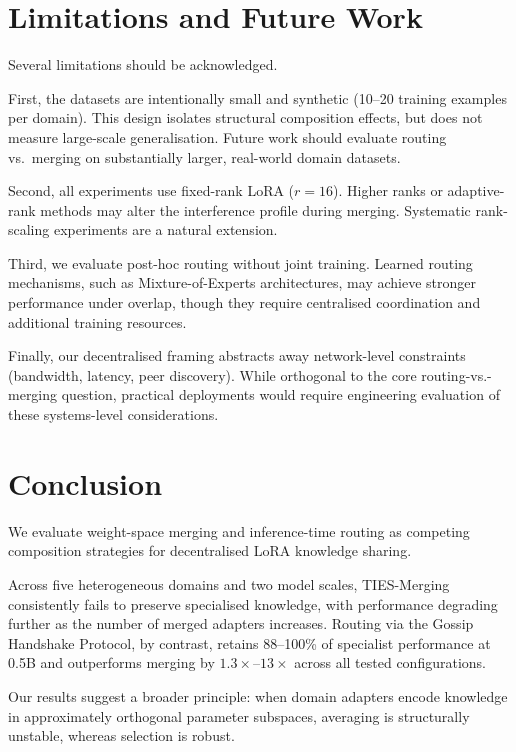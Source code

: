 \documentclass[conference, 10pt]{IEEEtran}
\begin{document}
\section{Limitations and Future Work}
\label{sec:limitations}

Several limitations should be acknowledged.

First, the datasets are intentionally small and synthetic
(10--20 training examples per domain).
This design isolates structural composition effects,
but does not measure large-scale generalisation.
Future work should evaluate routing vs.\ merging on
substantially larger, real-world domain datasets.

Second, all experiments use fixed-rank LoRA ($r = 16$).
Higher ranks or adaptive-rank methods may alter the
interference profile during merging.
Systematic rank-scaling experiments are a natural extension.

Third, we evaluate post-hoc routing without joint training.
Learned routing mechanisms, such as Mixture-of-Experts
architectures, may achieve stronger performance under overlap,
though they require centralised coordination and additional
training resources.

Finally, our decentralised framing abstracts away
network-level constraints (bandwidth, latency,
peer discovery).
While orthogonal to the core routing-vs.-merging question,
practical deployments would require engineering evaluation
of these systems-level considerations.

\section{Conclusion}
\label{sec:conclusion}

We evaluate weight-space merging and inference-time routing
as competing composition strategies for decentralised
LoRA knowledge sharing.

Across five heterogeneous domains and two model scales,
TIES-Merging consistently fails to preserve specialised
knowledge, with performance degrading further as the
number of merged adapters increases.
Routing via the Gossip Handshake Protocol, by contrast,
retains 88--100\% of specialist performance at 0.5B
and outperforms merging by $1.3\times$--$13\times$ across all tested
configurations.

Our results suggest a broader principle:
when domain adapters encode knowledge in approximately
orthogonal parameter subspaces,
averaging is structurally unstable,
whereas selection is robust.
\end{document}
